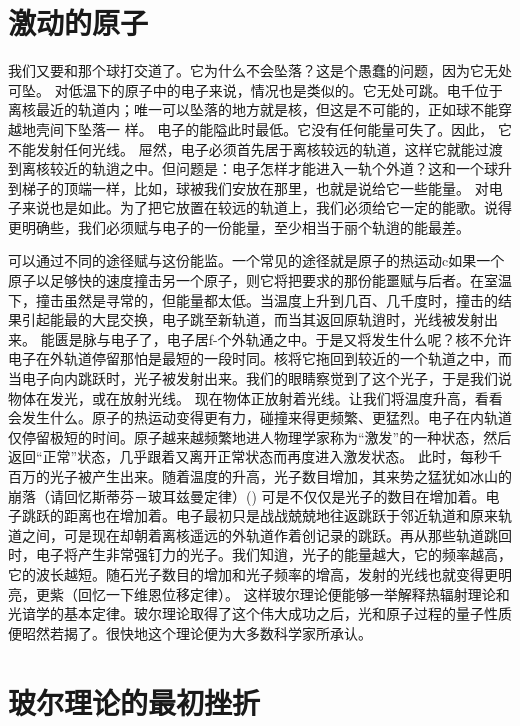 \section{激动的原子}

我们又要和那个球打交道了。它为什么不会坠落？这是个愚蠢的问题，因为它无处可坠。
对低温下的原子中的电子来说，情况也是类似的。它无处可跳。电千位于离核最近的轨道内；唯一可以坠落的地方就是核，但这是不可能的，正如球不能穿越地壳间下坠落一
样。
电子的能隘此时最低。它没有任何能量可失了。因此，
它不能发射任何光线。
屉然，电子必须首先居于离核较远的轨道，这样它就能过渡到离核较近的轨逍之中。但问题是：电子怎样才能进入一轨个外道？这和一个球升到梯子的顶端一样，比如，球被我们安放在那里，也就是说给它一些能量。
对电子来说也是如此。为了把它放置在较远的轨道上，我们必须给它一定的能歌。说得更明确些，我们必须赋与电子的一份能量，至少相当于丽个轨逍的能最差。

可以通过不同的途径赋与这份能监。一个常见的途径就是原子的热运动c如果一个原子以足够快的速度撞击另一个原子，则它将把要求的那份能噩赋与后者。在室温下，撞击虽然是寻常的，但能量都太低。当温度上升到几百、几千度时，撞击的结果引起能最的大昆交换，电子跳至新轨道，而当其返回原轨逍时，光线被发射出来。
能匮是脉与电子了，电子居f-个外轨通之中。于是又将发生什么呢？核不允许电子在外轨道停留那怕是最短的一段时同。核将它拖回到较近的一个轨道之中，而当电子向内跳跃时，光子被发射出来。我们的眼睛察觉到了这个光子，于是我们说物体在发光，或在放射光线。
现在物体正放射着光线。让我们将温度升高，看看会发生什么。原子的热运动变得更有力，碰撞来得更频繁、更猛烈。电子在内轨道仅停留极短的时间。原子越来越频繁地进人物理学家称为“激发”的一种状态，然后返回“正常”状态，几乎跟着又离开正常状态而再度进入激发状态。
此时，每秒千百万的光子被产生出来。随着温度的升高，光子数目增加，其来势之猛犹如冰山的崩落（请回忆斯蒂芬－玻耳兹曼定律）()
可是不仅仅是光子的数目在增加着。电子跳跃的距离也在增加着。电子最初只是战战兢兢地往返跳跃于邻近轨道和原来轨道之间，可是现在却朝着离核遥远的外轨道作着创记录的跳跃。再从那些轨道跳回时，电子将产生非常强钉力的光子。我们知逍，光子的能量越大，它的频率越高，它的波长越短。随石光子数目的增加和光子频率的增高，发射的光线也就变得更明亮，更紫（回忆一下维恩位移定律）。
这样玻尔理论便能够一举解释热辐射理论和光谙学的基本定律。玻尔理论取得了这个伟大成功之后，光和原子过程的量子性质便昭然若揭了。很快地这个理论便为大多数科学家所承认。

\section{玻尔理论的最初挫折}

